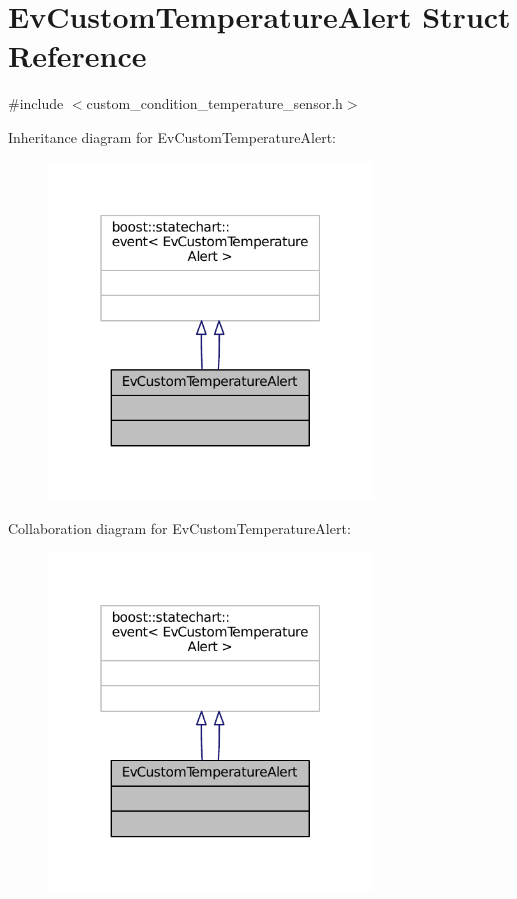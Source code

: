 \hypertarget{structEvCustomTemperatureAlert}{}\section{Ev\+Custom\+Temperature\+Alert Struct Reference}
\label{structEvCustomTemperatureAlert}


{\ttfamily \#include $<$custom\+\_\+condition\+\_\+temperature\+\_\+sensor.\+h$>$}



Inheritance diagram for Ev\+Custom\+Temperature\+Alert\+:
\nopagebreak
\begin{figure}[H]
\begin{center}
\leavevmode
\includegraphics[width=244pt]{structEvCustomTemperatureAlert__inherit__graph}
\end{center}
\end{figure}


Collaboration diagram for Ev\+Custom\+Temperature\+Alert\+:
\nopagebreak
\begin{figure}[H]
\begin{center}
\leavevmode
\includegraphics[width=244pt]{structEvCustomTemperatureAlert__coll__graph}
\end{center}
\end{figure}


